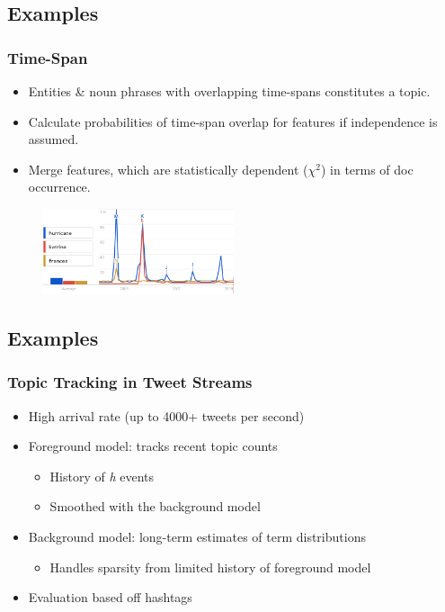 \documentclass{beamer}
\begin{document}
\subsection{Examples}
\begin{frame}
	\frametitle{Time-Span \cite{Swan:1999:EST:319950.319956}}
	\begin{itemize}
		\item Entities \& noun phrases with overlapping time-spans constitutes a topic.
		\item Calculate probabilities of time-span overlap for features if independence is assumed.
		\item Merge features, which are statistically dependent ($\chi^2$) in terms of doc occurrence.
	\end{itemize}
	\begin{figure}[h]
		\centering
		\includegraphics[width=0.5\textwidth]{images/timespan.png}
	\end{figure}
\end{frame}

\subsection{Examples}
\begin{frame}
	\frametitle{Topic Tracking in Tweet Streams \cite{Lin:2011:STA:2020408.2020476}}
	\begin{itemize}
		\item High arrival rate (up to 4000+ tweets per second)
		\item Foreground model: tracks recent topic counts
			\begin{itemize}
				\item History of \emph{h} events
				\item Smoothed with the background model
			\end{itemize}
		\item Background model: long-term estimates of term distributions
			\begin{itemize}
				\item Handles sparsity from limited history of foreground model
			\end{itemize}
		\item Evaluation based off hashtags
	\end{itemize}
\end{frame}
\end{document}
